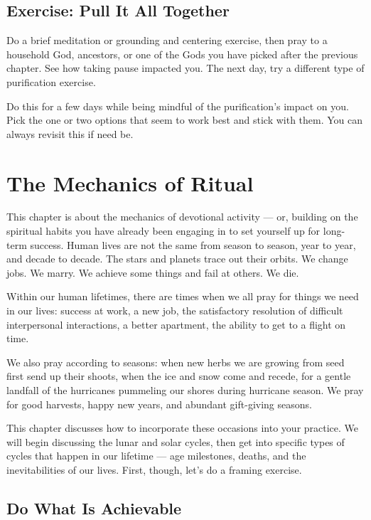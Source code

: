 \documentclass[
]{book}
\begin{document}
\hypertarget{exercise-pull-it-all-together}{%
\section{Exercise: Pull It All Together}\label{exercise-pull-it-all-together}}

Do a brief meditation or grounding and centering exercise, then pray to a household God, ancestors, or one of the Gods you have picked after the previous chapter. See how taking pause impacted you. The next day, try a different type of purification exercise.

Do this for a few days while being mindful of the purification's impact on you. Pick the one or two options that seem to work best and stick with them. You can always revisit this if need be.

\hypertarget{ritual-mechanics}{%
\chapter{The Mechanics of Ritual}\label{ritual-mechanics}}

This chapter is about the mechanics of devotional activity --- or, building on the spiritual habits you have already been engaging in to set yourself up for long-term success. Human lives are not the same from season to season, year to year, and decade to decade. The stars and planets trace out their orbits. We change jobs. We marry. We achieve some things and fail at others. We die.

Within our human lifetimes, there are times when we all pray for things we need in our lives: success at work, a new job, the satisfactory resolution of difficult interpersonal interactions, a better apartment, the ability to get to a flight on time.

We also pray according to seasons: when new herbs we are growing from seed first send up their shoots, when the ice and snow come and recede, for a gentle landfall of the hurricanes pummeling our shores during hurricane season. We pray for good harvests, happy new years, and abundant gift-giving seasons.

This chapter discusses how to incorporate these occasions into your practice. We will begin discussing the lunar and solar cycles, then get into specific types of cycles that happen in our lifetime --- age milestones, deaths, and the inevitabilities of our lives. First, though, let's do a framing exercise.

\hypertarget{do-what-is-achievable}{%
\section{Do What Is Achievable}\label{do-what-is-achievable}}
\end{document}

